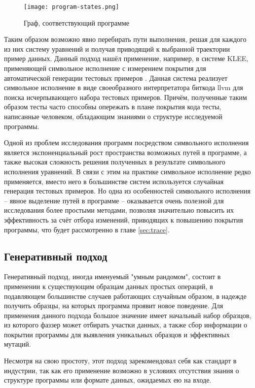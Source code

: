 \begin{figure}[h]
	\centering
	\texttt{[image: program-states.png]}
	\caption{Граф, соответствующий программе}
	\label{fig:py-control-flow-graph}
\end{figure}%

Таким образом возможно явно перебирать пути выполнения, решая для каждого из них систему уравнений и получая приводящий к выбранной траектории пример данных. Данный подход нашёл применение, например, в системе KLEE, применяющей символьное исполнение с измерением покрытия для автоматической генерации тестовых примеров \cite{klee}. Данная система реализует символьное исполнение в виде своеобразного интерпретатора биткода llvm для поиска исчерпывающего набора тестовых примеров. Причём, полученные таким образом тесты часто способны опережать в плане покрытия кода тесты, написанные человеком, обладающим знаниями о структуре исследуемой программы.

Одной из проблем исследования программ посредством символьного исполнения является экспоненциальный рост пространства возможных путей в программе, а также высокая сложность решения полученных в результате символьного исполнения уравнений. В связи с этим на практике символьное исполнение редко применяется, вместо него в большинстве систем используется случайная генерация тестовых примеров. Но одна из особенностей символьного исполнения -- явное выделение путей в программе -- оказывается очень полезной для исследования более простыми методами, позволяя значительно повысить их эффективность за счёт отбора изменений, приводящих к повышению покрытия программы, что будет рассмотренно в главе \ref{sec:trace}.

\subsection{Генеративный подход}

Генеративный подход, иногда именуемый "умным рандомом", состоит в применении к существующим образцам данных простых операций, в подавляющем большинстве случаев работающих случайным образом, в надежде получить образцы, на которых программа проявит новое поведение. Для применения данного подхода большое значение имеет начальный набор образцов, из которого фаззер может отбирать участки данных, а также сбор информации о покрытии программы для выявления уникальных образцов и эффективных мутаций.

Несмотря на свою простоту, этот подход зарекомендовал себя как стандарт в индустрии, так как его применение возможно в условиях отсутствия знания о структуре программы или формате данных, ожидаемых ею на входе.

